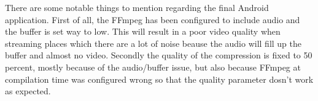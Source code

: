 There are some notable things to mention regarding the final Android application. First of all, the FFmpeg has been configured to include audio and the buffer is set way to low. This will result in a poor video quality when streaming places which there are a lot of noise beause the audio will fill up the buffer and almost no video. Secondly the quality of the compression is fixed to 50 percent, mostly because of the audio/buffer issue, but also because FFmpeg at compilation time was configured wrong so that the quality parameter dosn't work as expected.


